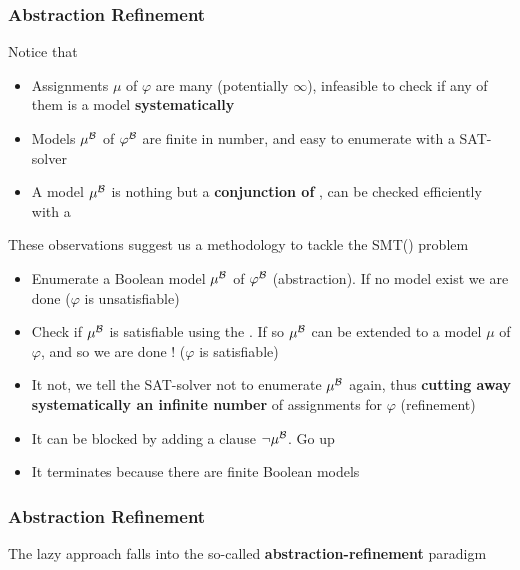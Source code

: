 \begin{frame}
  \frametitle{Abstraction Refinement}

  \scriptsize

  Notice that
  \begin{itemize}
    \item Assignments $\mu$ of $\varphi$ are many (potentially $\infty$),
          infeasible to check if any of them is a model {\bf systematically}
    \item Models $\mu^{\mathcal{B}}$ of $\varphi^{\mathcal{B}}$ are finite in number,
          and easy to enumerate with a SAT-solver
    \item A model $\mu^{\mathcal{B}}$ is nothing but a {\bf conjunction of \tatoms},
          can be checked efficiently with a \tsolver
  \end{itemize}
  \vfill
  \pause
  These observations suggest us a methodology
  to tackle the SMT(\T) problem
  \begin{itemize}
    \item Enumerate a Boolean model $\mu^{\mathcal{B}}$ of $\varphi^{\mathcal{B}}$ (abstraction). If no model 
	  exist we are done ($\varphi$ is unsatisfiable) \pause
    \item Check if $\mu^{\mathcal{B}}$ is satisfiable using the \tsolver. If so $\mu^{\mathcal{B}}$ can be extended 
          to a model $\mu$ of $\varphi$, and so we are done ! ($\varphi$ is satisfiable) \pause
    \item It not, we tell the SAT-solver not to enumerate $\mu^{\mathcal{B}}$ again,
          thus {\bf cutting away systematically an infinite number} 
	  of assignments for $\varphi$ (refinement) \pause
    \item It can be blocked by adding a clause $\neg \mu^{\mathcal{B}}$. Go up \pause
    \item It terminates because there are finite Boolean models
  \end{itemize}

\end{frame}

\begin{frame}
  \frametitle{Abstraction Refinement}

  \scriptsize
  
  The lazy approach falls into the so-called {\bf abstraction-refinement} 
  paradigm
  \vfill
  \begin{center}
  \scalebox{.5}{}
  \end{center}

\end{frame}
